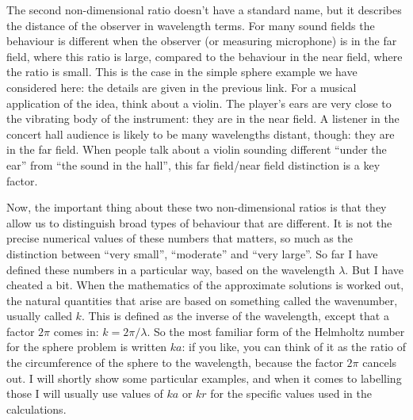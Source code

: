   The second non-dimensional ratio doesn't have a standard name, but it 
  describes the distance of the observer in wavelength terms. For many sound 
  fields the behaviour is different when the observer (or measuring microphone) 
  is in the far field, where this ratio is large, compared to the behaviour in 
  the near field, where the ratio is small. This is the case in the simple 
  sphere example we have considered here: the details are given in the previous 
  link. For a musical application of the idea, think about a violin. The 
  player's ears are very close to the vibrating body of the instrument: they 
  are in the near field. A listener in the concert hall audience is likely to 
  be many wavelengths distant, though: they are in the far field. When people 
  talk about a violin sounding different ``under the ear'' from ``the sound in 
  the hall'', this far field/near field distinction is a key factor. 

  Now, the important thing about these two non-dimensional ratios is that they 
  allow us to distinguish broad types of behaviour that are different. It is 
  not the precise numerical values of these numbers that matters, so much as 
  the distinction between ``very small'', ``moderate'' and ``very large''. So 
  far I have defined these numbers in a particular way, based on the wavelength 
  $\lambda$. But I have cheated a bit. When the mathematics of the approximate 
  solutions is worked out, the natural quantities that arise are based on 
  something called the wavenumber, usually called $k$. This is defined as the 
  inverse of the wavelength, except that a factor $2 \pi$ comes in: $k=2 \pi / 
  \lambda$. So the most familiar form of the Helmholtz number for the sphere 
  problem is written $ka$: if you like, you can think of it as the ratio of the 
  circumference of the sphere to the wavelength, because the factor $2 \pi$ 
  cancels out. I will shortly show some particular examples, and when it comes 
  to labelling those I will usually use values of $ka$ or $kr$ for the specific 
  values used in the calculations. 


